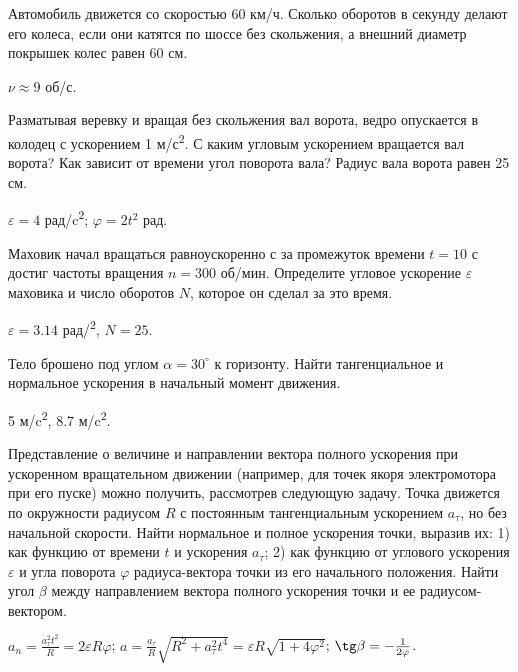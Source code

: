 \begin{ex} %
Автомобиль движется со скоростью 60 км/ч. Сколько оборотов в секунду делают его колеса, если они катятся по шоссе без скольжения, а внешний диаметр покрышек колес равен 60 см.
\begin{ans}
$\nu \approx 9$ об/с.
\end{ans}
\end{ex}

\begin{ex} %
Разматывая веревку и вращая без скольжения вал ворота, ведро опускается в колодец с ускорением 1 м/с\textsuperscript{2}. С каким угловым ускорением вращается вал ворота? Как зависит от времени угол поворота вала? Радиус вала ворота равен 25 см.
\begin{ans}
$\varepsilon = 4$ рад/c\textsuperscript{2}; $\varphi = 2t^2$ рад.
\end{ans}
\end{ex}

\begin{ex} %
Маховик начал вращаться равноускоренно с за промежуток времени $t=10$ с достиг частоты вращения $n=300$ об/мин. Определите угловое ускорение $\varepsilon$ маховика и число оборотов $N$, которое он сделал за это время.
\begin{ans}
$\varepsilon =  3.14$ рад/\textsuperscript{2}, $N = 25$.
\end{ans}
\end{ex}

\begin{ex} %
Тело брошено под углом $\alpha = 30^{\circ}$ к горизонту. Найти тангенциальное и нормальное ускорения в начальный момент движения.
\begin{ans}
5 м/c\textsuperscript{2}, 8.7 м/c\textsuperscript{2}.
\end{ans}
\end{ex}

\begin{ex} %
Представление о величине и направлении вектора полного ускорения при ускоренном вращательном движении (например, для точек якоря электромотора при его пуске) можно получить, рассмотрев следующую задачу. Точка движется по окружности радиусом $R$ с постоянным тангенциальным ускорением $a_{\tau}$, но без начальной скорости. Найти нормальное и полное ускорения точки, выразив их: 1) как функцию от времени $t$ и ускорения $a_{\tau}$; 2) как функцию от углового ускорения $\varepsilon$ и угла поворота $\varphi$ радиуса-вектора точки из его начального положения. Найти угол $\beta$ между направлением вектора полного ускорения точки и ее
радиусом-вектором.
\begin{ans}
$a_n = \frac{a_{\tau}^2 t^2}{R} = 2 \varepsilon R \varphi$; $a = \frac{a_{\tau}}{R} \sqrt{R^2 + a_{\tau}^2 t^4} = \varepsilon R \sqrt{1 + 4 \varphi^2}$; $\tg \beta = -\frac{1}{2\varphi}$.
\end{ans}
\end{ex}

